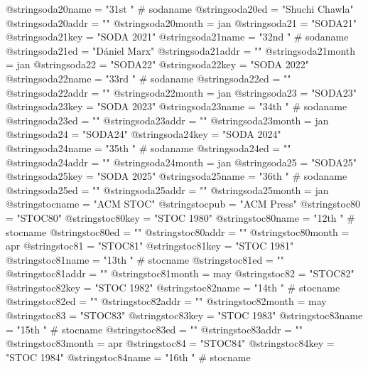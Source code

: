 @string{soda20name =            "31st " # sodaname}
@string{soda20ed =              "Shuchi Chawla"}
@string{soda20addr =            ""}
@string{soda20month =           jan}
@string{soda21 =                "SODA21"}
@string{soda21key =             "SODA 2021"}
@string{soda21name =            "32nd " # sodaname}
@string{soda21ed =              "D{\'a}niel Marx"}
@string{soda21addr =            ""}
@string{soda21month =           jan}
@string{soda22 =                "SODA22"}
@string{soda22key =             "SODA 2022"}
@string{soda22name =            "33rd " # sodaname}
@string{soda22ed =              ""}
@string{soda22addr =            ""}
@string{soda22month =           jan}
@string{soda23 =                "SODA23"}
@string{soda23key =             "SODA 2023"}
@string{soda23name =            "34th " # sodaname}
@string{soda23ed =              ""}
@string{soda23addr =            ""}
@string{soda23month =           jan}
@string{soda24 =                "SODA24"}
@string{soda24key =             "SODA 2024"}
@string{soda24name =            "35th " # sodaname}
@string{soda24ed =              ""}
@string{soda24addr =            ""}
@string{soda24month =           jan}
@string{soda25 =                "SODA25"}
@string{soda25key =             "SODA 2025"}
@string{soda25name =            "36th " # sodaname}
@string{soda25ed =              ""}
@string{soda25addr =            ""}
@string{soda25month =           jan}
@string{stocname =              "ACM STOC"}
@string{stocpub =               "{ACM} Press"}
@string{stoc80 =                "STOC80"}
@string{stoc80key =             "STOC 1980"}
@string{stoc80name =            "12th " # stocname}
@string{stoc80ed =              ""}
@string{stoc80addr =            ""}
@string{stoc80month =           apr}
@string{stoc81 =                "STOC81"}
@string{stoc81key =             "STOC 1981"}
@string{stoc81name =            "13th " # stocname}
@string{stoc81ed =              ""}
@string{stoc81addr =            ""}
@string{stoc81month =           may}
@string{stoc82 =                "STOC82"}
@string{stoc82key =             "STOC 1982"}
@string{stoc82name =            "14th " # stocname}
@string{stoc82ed =              ""}
@string{stoc82addr =            ""}
@string{stoc82month =           may}
@string{stoc83 =                "STOC83"}
@string{stoc83key =             "STOC 1983"}
@string{stoc83name =            "15th " # stocname}
@string{stoc83ed =              ""}
@string{stoc83addr =            ""}
@string{stoc83month =           apr}
@string{stoc84 =                "STOC84"}
@string{stoc84key =             "STOC 1984"}
@string{stoc84name =            "16th " # stocname}
